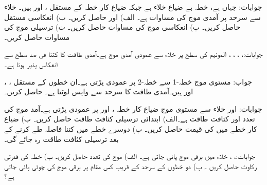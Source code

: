 جوابات: جہاں  ہے، 
خطہ  بے ضیاع خلاء ہے جبکہ ضیاع کار خطہ  کے مستقل ،  اور  ہیں۔ خلاء سے سرحد پر آمدی موج کی مساوات
  ہے۔ الف)  اور  حاصل کریں۔ ب) انعکاسی مستقل حاصل کریں۔ پ) انعکاسی موج  کی مساوات حاصل کریں۔ ت) ترسیلی موج  کی مساوات حاصل کریں۔

جوابات:، ، ،
 ، 
المونیم کی سطح  پر خلاء سے عمودی آمدی موج  ہے۔آمدی طاقت کا کتنا فی صد سطح سے انعکاس پذیر ہوتا ہے۔

جواب:
مستوی موج خطہ-1 سے خطہ-2 پر عمودی پڑتی ہے۔ان خطوں کے مستقل ، ، اور
  ہیں۔آمدی طاقت کا  سرحد سے واپس لوٹتا ہے۔ حاصل کریں۔

جوابات: اور 
خلاء سے مستوی موج ضیاع کار خطہ ،  اور  پر عمودی پڑتی ہے۔آمد موج کی تعدد  اور کثافت طاقت  ہے۔الف) ابتدائی ترسیلی کثافت طاقت حاصل کریں۔ ب) ضیاع کار خطے میں  کی قیمت حاصل کریں۔ پ) دوسرے خطے میں کتنا فاصلہ طے کرنے کے بعد ترسیلی کثافت طاقت  رہ جائے گی۔

جوابات:، ، 
خلاء  میں برقی موج  پائی جاتی ہے۔ الف) موج کی تعدد حاصل کریں۔ ب) خطہ   کی قدرتی رکاوٹ حاصل کریں ۔ پ) دو خطوں کے سرحد کے قریب کس مقام پر برقی موج کی چوٹی پائی جاتی ہے؟

